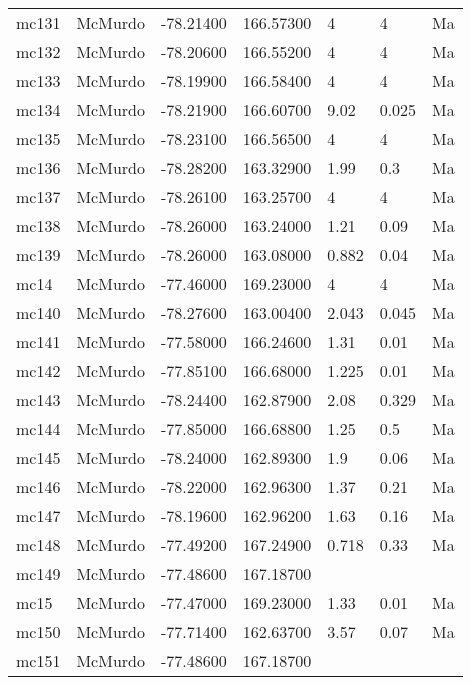 \documentclass{article}
\begin{document}
\begin{longtable}{llrrlll}
 mc131 &  McMurdo & -78.21400 &  166.57300 &       4 &         4 &    Ma \\
 mc132 &  McMurdo & -78.20600 &  166.55200 &       4 &         4 &    Ma \\
 mc133 &  McMurdo & -78.19900 &  166.58400 &       4 &         4 &    Ma \\
 mc134 &  McMurdo & -78.21900 &  166.60700 &    9.02 &     0.025 &    Ma \\
 mc135 &  McMurdo & -78.23100 &  166.56500 &       4 &         4 &    Ma \\
 mc136 &  McMurdo & -78.28200 &  163.32900 &    1.99 &       0.3 &    Ma \\
 mc137 &  McMurdo & -78.26100 &  163.25700 &       4 &         4 &    Ma \\
 mc138 &  McMurdo & -78.26000 &  163.24000 &    1.21 &      0.09 &    Ma \\
 mc139 &  McMurdo & -78.26000 &  163.08000 &   0.882 &      0.04 &    Ma \\
  mc14 &  McMurdo & -77.46000 &  169.23000 &       4 &         4 &    Ma \\
 mc140 &  McMurdo & -78.27600 &  163.00400 &   2.043 &     0.045 &    Ma \\
 mc141 &  McMurdo & -77.58000 &  166.24600 &    1.31 &      0.01 &    Ma \\
 mc142 &  McMurdo & -77.85100 &  166.68000 &   1.225 &      0.01 &    Ma \\
 mc143 &  McMurdo & -78.24400 &  162.87900 &    2.08 &     0.329 &    Ma \\
 mc144 &  McMurdo & -77.85000 &  166.68800 &    1.25 &       0.5 &    Ma \\
 mc145 &  McMurdo & -78.24000 &  162.89300 &     1.9 &      0.06 &    Ma \\
 mc146 &  McMurdo & -78.22000 &  162.96300 &    1.37 &      0.21 &    Ma \\
 mc147 &  McMurdo & -78.19600 &  162.96200 &    1.63 &      0.16 &    Ma \\
 mc148 &  McMurdo & -77.49200 &  167.24900 &   0.718 &      0.33 &    Ma \\
 mc149 &  McMurdo & -77.48600 &  167.18700 &         &           &       \\
  mc15 &  McMurdo & -77.47000 &  169.23000 &    1.33 &      0.01 &    Ma \\
 mc150 &  McMurdo & -77.71400 &  162.63700 &    3.57 &      0.07 &    Ma \\
 mc151 &  McMurdo & -77.48600 &  167.18700 &         &           &       \\

\end{longtable}
\end{document}
